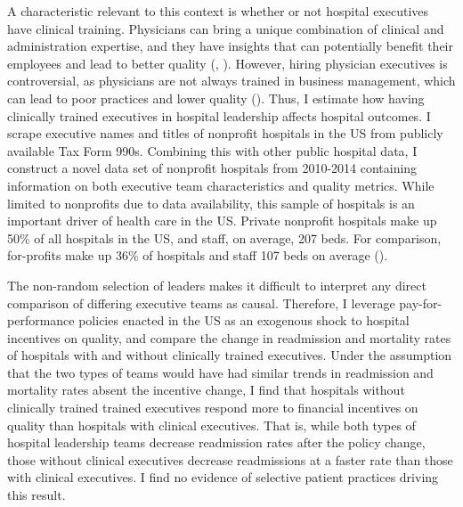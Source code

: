 \documentclass[12pt]{article}
\begin{document}
    A characteristic relevant to this context is whether or not hospital executives have clinical training. Physicians can bring a unique combination of clinical and administration expertise, and they have insights that can potentially benefit their employees and lead to better quality (\cite{Stajduhar_2023}, \cite{Ahmed_2022}). However, hiring physician executives is controversial, as physicians are not always trained in business management, which can lead to poor practices and lower quality (\cite{HarvardBusinessReview2018}). Thus, I estimate how having clinically trained executives in hospital leadership affects hospital outcomes. I scrape executive names and titles of nonprofit hospitals in the US from publicly available Tax Form 990s. Combining this with other public hospital data, I construct a novel data set of nonprofit hospitals from 2010-2014 containing information on both executive team characteristics and quality metrics. While limited to nonprofits due to data availability, this sample of hospitals is an important driver of health care in the US. Private nonprofit hospitals make up 50\% of all hospitals in the US, and staff, on average, 207 beds. For comparison, for-profits make up 36\% of hospitals and staff 107 beds on average (\cite{ASPE_2023}). 
    
    The non-random selection of leaders makes it difficult to interpret any direct comparison of differing executive teams as causal. Therefore, I leverage pay-for-performance policies enacted in the US as an exogenous shock to hospital incentives on quality, and compare the change in readmission and mortality rates of hospitals with and without clinically trained executives. Under the assumption that the two types of teams would have had similar trends in readmission and mortality rates absent the incentive change, I find that hospitals without clinically trained trained executives respond more to financial incentives on quality than hospitals with clinical executives. That is, while both types of hospital leadership teams decrease readmission rates after the policy change, those without clinical executives decrease readmissions at a faster rate than those with clinical executives. I find no evidence of selective patient practices driving this result. 
\end{document}
